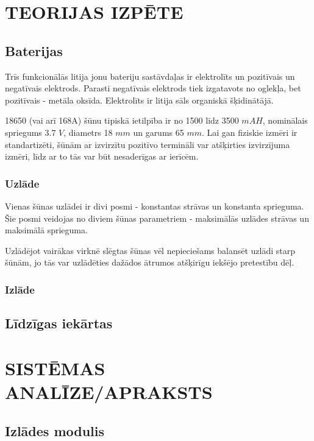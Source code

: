 \documentclass[12pt,fleqn,titlepage,oneside]{article}
\numberwithin{equation}{section}
\numberwithin{figure}{section}
\numberwithin{table}{section}
\begin{document}
\FloatBarrier
\newpage
\section{\texorpdfstring{\MakeUppercase{Teorijas izpēte}}{Teorijas izpēte}}

\subsection{Baterijas}

Trīs funkcionālās litija jonu bateriju sastāvdaļas ir elektrolīts un pozitīvais un negatīvais elektrods.
Parasti negatīvais elektrods tiek izgatavots no oglekļa, bet pozitīvais - metāla oksīda.
Elektrolīts ir litija sāls organiskā šķidinātājā.

18650 (vai arī 168A) šūnu tipiskā ietilpība ir no 1500 līdz 3500 $mAH$, nominālais spriegums 3.7 $V$,
diametrs 18 $mm$ un garums 65 $mm$.
Lai gan fiziskie izmēri ir standartizēti, šūnām ar izvirzītu pozitīvo termināli var atšķirties izvirzījuma izmēri,
līdz ar to tās var būt nesaderīgas ar ierīcēm.

\subsubsection{Uzlāde}

Vienas šūnas uzlādei ir divi posmi - konstantas strāvas un konstanta sprieguma.
Šie posmi veidojas no diviem šūnas parametriem - maksimālās uzlādes strāvas un maksimālā sprieguma.

Uzlādējot vairākas virknē slēgtas šūnas vēl nepieciešams balansēt uzlādi starp šūnām, 
jo tās var uzlādēties dažādos ātrumos atšķirīgu iekšējo pretestību dēļ.

\subsubsection{Izlāde}

\subsection{Līdzīgas iekārtas}

\FloatBarrier
\newpage
\section{\texorpdfstring{\MakeUppercase{Sistēmas analīze/apraksts}}{Sistēmas analīze/apraksts}}

\subsection{Izlādes modulis}
\end{document}
